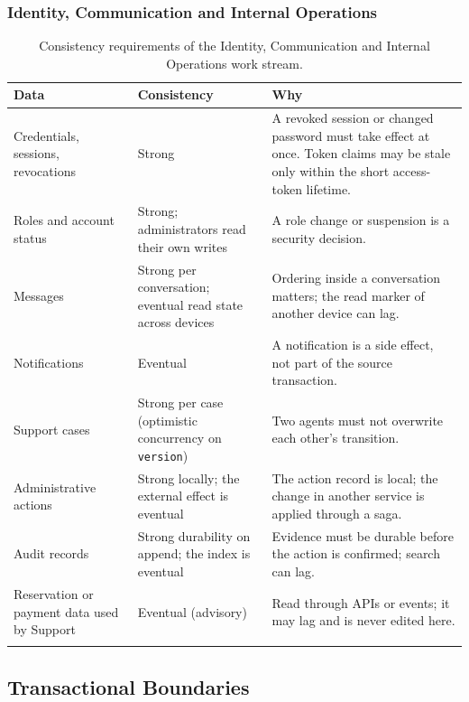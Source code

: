 \begingroup
\setlength{\emergencystretch}{3em}
\subsubsection{Identity, Communication and Internal Operations}
\label{sec:id-consistency}

\begin{longtable}{@{}L{3.0cm}L{4.4cm}L{6.4cm}@{}}
\toprule
\textbf{Data} & \textbf{Consistency} & \textbf{Why} \\
\midrule
\endhead
Credentials, sessions, revocations & Strong &
  A revoked session or changed password must take effect at once. Token
  claims may be stale only within the short access-token lifetime. \\
Roles and account status & Strong; administrators read their own writes &
  A role change or suspension is a security decision. \\
Messages & Strong per conversation; eventual read state across devices &
  Ordering inside a conversation matters; the read marker of another device
  can lag. \\
Notifications & Eventual &
  A notification is a side effect, not part of the source transaction. \\
Support cases & Strong per case (optimistic concurrency on \texttt{version}) &
  Two agents must not overwrite each other's transition. \\
Administrative actions & Strong locally; the external effect is eventual &
  The action record is local; the change in another service is applied
  through a saga. \\
Audit records & Strong durability on append; the index is eventual &
  Evidence must be durable before the action is confirmed; search can lag. \\
Reservation or payment data used by Support & Eventual (advisory) &
  Read through APIs or events; it may lag and is never edited here. \\
\bottomrule
\caption{Consistency requirements of the Identity, Communication and
Internal Operations work stream.}
\label{tab:id-consistency}
\end{longtable}
\endgroup

\subsection{Transactional Boundaries}

